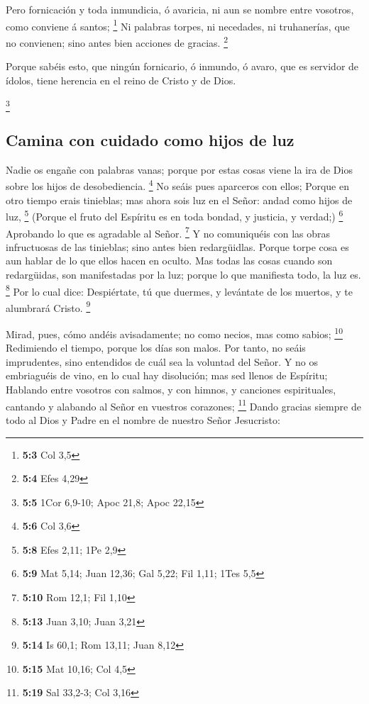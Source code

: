  Pero fornicación y toda inmundicia, ó avaricia, ni aun se
nombre entre vosotros, como conviene á santos; \footnote{\textbf{5:3}
  Col 3,5}  Ni palabras torpes, ni necedades, ni
truhanerías, que no convienen; sino antes bien acciones de gracias.
\footnote{\textbf{5:4} Efes 4,29}

 Porque sabéis esto, que ningún fornicario, ó inmundo, ó
avaro, que es servidor de ídolos, tiene herencia en el reino de Cristo y
de Dios.

\footnote{\textbf{5:5} 1Cor 6,9-10; Apoc 21,8; Apoc 22,15}

\hypertarget{camina-con-cuidado-como-hijos-de-luz}{%
\subsection{Camina con cuidado como hijos de
luz}\label{camina-con-cuidado-como-hijos-de-luz}}

 Nadie os engañe con palabras vanas; porque por estas cosas
viene la ira de Dios sobre los hijos de desobediencia. \footnote{\textbf{5:6}
  Col 3,6}  No seáis pues aparceros con ellos; 
Porque en otro tiempo erais tinieblas; mas ahora sois luz en el Señor:
andad como hijos de luz, \footnote{\textbf{5:8} Efes 2,11; 1Pe 2,9}
 (Porque el fruto del Espíritu es en toda bondad, y
justicia, y verdad;) \footnote{\textbf{5:9} Mat 5,14; Juan 12,36; Gal
  5,22; Fil 1,11; 1Tes 5,5}  Aprobando lo que es agradable
al Señor. \footnote{\textbf{5:10} Rom 12,1; Fil 1,10}  Y no
comuniquéis con las obras infructuosas de las tinieblas; sino antes bien
redargüidlas.  Porque torpe cosa es aun hablar de lo que
ellos hacen en oculto.  Mas todas las cosas cuando son
redargüidas, son manifestadas por la luz; porque lo que manifiesta todo,
la luz es. \footnote{\textbf{5:13} Juan 3,10; Juan 3,21} 
Por lo cual dice: Despiértate, tú que duermes, y levántate de los
muertos, y te alumbrará Cristo. \footnote{\textbf{5:14} Is 60,1; Rom
  13,11; Juan 8,12}

 Mirad, pues, cómo andéis avisadamente; no como necios, mas
como sabios; \footnote{\textbf{5:15} Mat 10,16; Col 4,5} 
Redimiendo el tiempo, porque los días son malos.  Por
tanto, no seáis imprudentes, sino entendidos de cuál sea la voluntad del
Señor.  Y no os embriaguéis de vino, en lo cual hay
disolución; mas sed llenos de Espíritu;  Hablando entre
vosotros con salmos, y con himnos, y canciones espirituales, cantando y
alabando al Señor en vuestros corazones; \footnote{\textbf{5:19} Sal
  33,2-3; Col 3,16}  Dando gracias siempre de todo al Dios
y Padre en el nombre de nuestro Señor Jesucristo:

